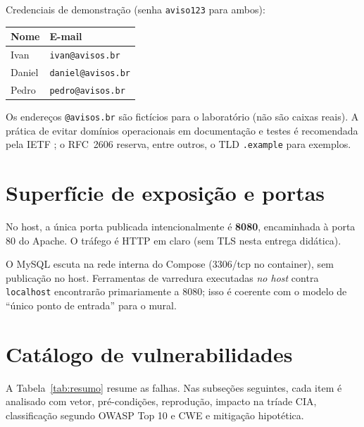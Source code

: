   Credenciais de demonstração (senha \texttt{aviso123} para ambos):
  
  \begin{center}
  \begin{tabular}{ll}
  \toprule
  Nome & E-mail \\
  \midrule
  Ivan & \texttt{ivan@avisos.br} \\
  Daniel & \texttt{daniel@avisos.br} \\
  Pedro & \texttt{pedro@avisos.br} \\
  \bottomrule
  \end{tabular}
  \end{center}
  
  Os endereços \texttt{@avisos.br} são fictícios para o laboratório (não são caixas reais). A
  prática de evitar domínios operacionais em documentação e testes é recomendada pela IETF
  \cite{rfc2606}; o RFC~2606 reserva, entre outros, o TLD \texttt{.example} para exemplos.
  
  \section{Superfície de exposição e portas}\label{sec:portas}
  
  No host, a única porta publicada intencionalmente é \textbf{8080}, encaminhada à porta 80 do Apache.
  O tráfego é HTTP em claro (sem TLS nesta entrega didática).
  
  O MySQL escuta na rede interna do Compose (3306/tcp no container), sem publicação no host. Ferramentas
  de varredura executadas \emph{no host} contra \texttt{localhost} encontrarão primariamente a 8080;
  isso é coerente com o modelo de ``único ponto de entrada'' para o mural.
  
  \section{Catálogo de vulnerabilidades}
  
  A Tabela~\ref{tab:resumo} resume as falhas. Nas subseções seguintes, cada item é analisado com
  vetor, pré-condições, reprodução, impacto na tríade CIA, classificação segundo OWASP Top 10
  \cite{owasp} e CWE \cite{cwe} e mitigação hipotética.
  
